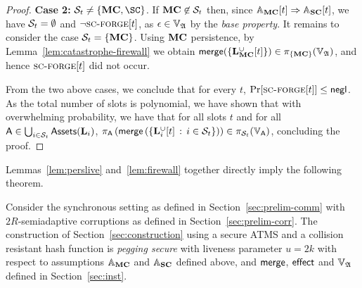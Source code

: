 \begin{proof}
  \textbf{Case 2:}
  $\Secure_t \neq \{\MC,\SC\}$.
  If $\MC\not\in\Secure_t$ then, since
  $\Assum_\MC[t] \Rightarrow \Assum_\Sidechain[t]$, we have $\Secure_t = \emptyset$ and
  $\lnot \textsc{sc-forge}[t]$, as $\epsilon \in \adalang$ by the
  \emph{base property}.
  It remains to consider the case $\Secure_t = \{\MC\}$. Using $\MC$ persistence,
  by Lemma~\ref{lem:catastrophe-firewall} we obtain
  $\merge(\{\Ledger_\MC^{\cup}[t]\}) \in \proj_{\{\MC\}}(\adalang)$,
  and hence $\scforge[t]$ did not occur.

  From the two above cases, we conclude that for every $t$,
  $\Pr[\textsc{sc-forge}[t]] \leq \textsf{negl}$. As the total number of slots is
  polynomial,
  we have shown that with overwhelming probability,
  we have that for all slots $t$ and for all
  $\Asset\in\bigcup_{i\in\Secure_t}\Assets(\Ledger_i)$,
  $
  \proj_{\Asset}\left(
    \merge\left(
      \setd
        {\Ledger_i^{\cup}[t]}
        {i\in\Secure_t}
    \right)
  \right)
  \in
  \proj_{\Secure_t}(\ValLang_\Asset)
  $, concluding the proof.
\end{proof}

  Lemmas~\ref{lem:perslive} and~\ref{lem:firewall} together directly imply the
  following theorem.

\begin{theorem}
  \label{thm:security}
  Consider the synchronous setting as defined in Section~\ref{sec:prelim-comm}
  with $2R$-semiadaptive corruptions as defined in
  Section~\ref{sec:prelim-corr}.  The construction of
  Section~\ref{sec:construction} using a secure ATMS and a collision resistant
  hash function is \textit{pegging secure} with liveness parameter
  $u=2k$
  with respect to
  assumptions $\Assum_\MC$ and $\Assum_\Sidechain$ defined above,
  and $\merge$, $\effect$ and
  $\adalang$ defined in Section~\ref{sec:inst}.
\end{theorem}
